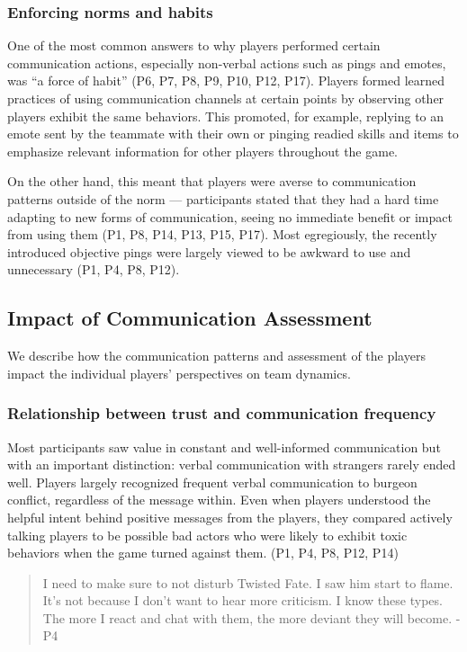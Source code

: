 \subsubsection{Enforcing norms and habits}
One of the most common answers to why players performed certain communication actions, especially non-verbal actions such as pings and emotes, was ``a force of habit'' (P6, P7, P8, P9, P10, P12, P17). Players formed learned practices of using communication channels at certain points by observing other players exhibit the same behaviors. This promoted, for example, replying to an emote sent by the teammate with their own or pinging readied skills and items to emphasize relevant information for other players throughout the game. 

On the other hand, this meant that players were averse to communication patterns outside of the norm --- participants stated that they had a hard time adapting to new forms of communication, seeing no immediate benefit or impact from using them (P1, P8, P14, P13, P15, P17). Most egregiously, the recently introduced objective pings were largely viewed to be awkward to use and unnecessary (P1, P4, P8, P12).


\subsection{Impact of Communication Assessment}
We describe how the communication patterns and assessment of the players impact the individual players' perspectives on team dynamics.

\subsubsection{Relationship between trust and communication frequency}
Most participants saw value in constant and well-informed communication but with an important distinction: verbal communication with strangers rarely ended well. Players largely recognized frequent verbal communication to burgeon conflict, regardless of the message within. Even when players understood the helpful intent behind positive messages from the players, they compared actively talking players to be possible bad actors who were likely to exhibit toxic behaviors when the game turned against them. (P1, P4, P8, P12, P14)

\begin{quote}
I need to make sure to not disturb Twisted Fate. I saw him start to flame. It's not because I don't want to hear more criticism. I know these types. The more I react and chat with them, the more deviant they will become. - P4  
\end{quote}

